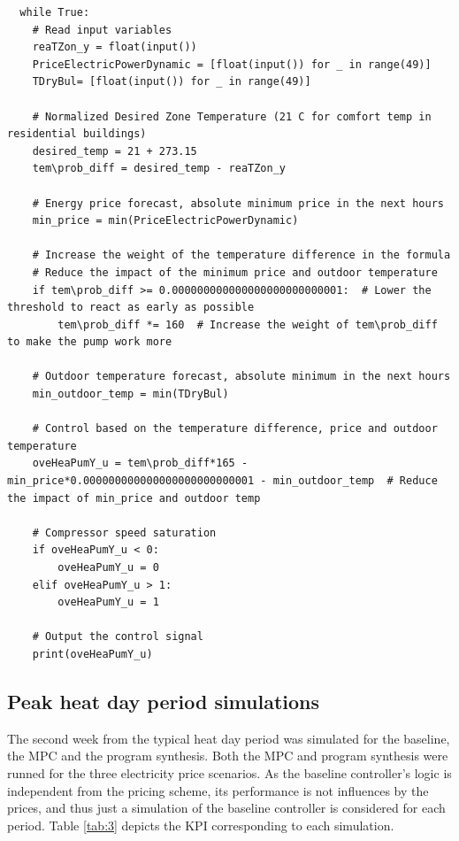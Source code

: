 \begin{lstlisting}
  while True:
    # Read input variables
    reaTZon_y = float(input())
    PriceElectricPowerDynamic = [float(input()) for _ in range(49)]
    TDryBul= [float(input()) for _ in range(49)]

    # Normalized Desired Zone Temperature (21 C for comfort temp in residential buildings)
    desired_temp = 21 + 273.15
    tem\prob_diff = desired_temp - reaTZon_y

    # Energy price forecast, absolute minimum price in the next hours
    min_price = min(PriceElectricPowerDynamic)

    # Increase the weight of the temperature difference in the formula
    # Reduce the impact of the minimum price and outdoor temperature
    if tem\prob_diff >= 0.000000000000000000000000001:  # Lower the threshold to react as early as possible
        tem\prob_diff *= 160  # Increase the weight of tem\prob_diff to make the pump work more

    # Outdoor temperature forecast, absolute minimum in the next hours
    min_outdoor_temp = min(TDryBul)

    # Control based on the temperature difference, price and outdoor temperature
    oveHeaPumY_u = tem\prob_diff*165 - min_price*0.000000000000000000000000001 - min_outdoor_temp  # Reduce the impact of min_price and outdoor temp

    # Compressor speed saturation
    if oveHeaPumY_u < 0:
        oveHeaPumY_u = 0
    elif oveHeaPumY_u > 1:
        oveHeaPumY_u = 1

    # Output the control signal
    print(oveHeaPumY_u)
\end{lstlisting}

\newpage
\subsection{Peak heat day period simulations}
\label{'results_peak'}
The second week from the typical heat day period was simulated for the baseline, the MPC and the program synthesis. Both the MPC and program synthesis were runned for the three electricity price scenarios. As the baseline controller's logic is independent from the pricing scheme, its performance is not influences by the prices, and thus just a simulation of the baseline controller is considered for each period. Table \ref{tab:3} depicts the KPI corresponding to each simulation.

